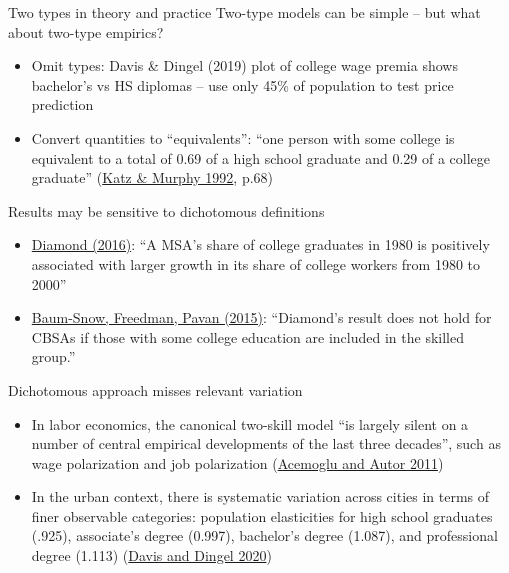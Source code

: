 \documentclass[11pt,notes=hide,aspectratio=169]{beamer}
\begin{document}
\begin{frame}{Two types in theory and practice}
Two-type models can be simple -- but what about two-type empirics?
\begin{itemize}
	\item Omit types: Davis \& Dingel (2019) plot of college wage premia shows bachelor's vs HS diplomas -- use only 45\% of population to test price prediction
	\item Convert quantities to ``equivalents'': ``one person with some college is equivalent to a total of 0.69 of a high school graduate and 0.29 of a college graduate'' (\href{http://www.jstor.org/stable/2118323}{Katz \& Murphy 1992}, p.68)
\end{itemize}
\pause Results may be sensitive to dichotomous definitions
\begin{itemize}
	\item \href{https://www.aeaweb.org/articles?id=10.1257/aer.20131706}{Diamond (2016)}: ``A MSA's share of college graduates in 1980 is positively associated with larger growth in its share of college workers from 1980 to 2000''
	\item \href{https://www.aeaweb.org/articles?id=10.1257/app.20160510}{Baum-Snow, Freedman, Pavan (2015)}: ``Diamond's result does not hold for CBSAs if those with some college education are included in the skilled group.''
\end{itemize}
\end{frame}
\begin{frame}{Dichotomous approach misses relevant variation}
\begin{itemize}
	\item In labor economics, the canonical two-skill model ``is largely silent on a number of central empirical developments of the last three decades'', such as wage polarization and job polarization (\href{http://www.sciencedirect.com/science/article/pii/S0169721811024105}{Acemoglu and Autor 2011})
	\item In the urban context, there is systematic variation across cities in terms of finer observable categories: population elasticities for high school graduates (.925), associate's degree (0.997), bachelor's degree (1.087), and professional degree (1.113) (\href{https://doi.org/10.1016/j.jinteco.2020.103291}{Davis and Dingel 2020})
\end{itemize}
\end{frame}
\end{document}
